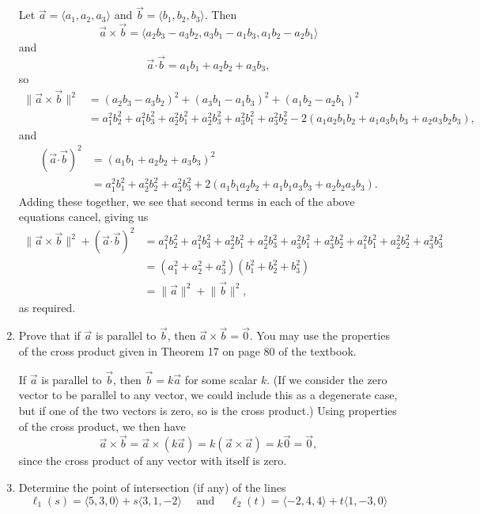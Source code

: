 \documentclass[12pt]{article}
\newcommand{\len}[1]{\lVert #1\rVert}
\newcommand{\dotp}{\boldsymbol{\cdot}}
\begin{document}
\begin{enumerate}
Let $\vec{a} = \langle a_1,a_2,a_3\rangle$ and $\vec{b}=\langle b_1,b_2,b_3\rangle$. Then
\[
\vec{a}\times\vec{b} = \langle a_2b_3-a_3b_2,a_3b_1-a_1b_3,a_1b_2-a_2b_1\rangle
\]
and
\[
\vec{a}\dotp\vec{b} = a_1b_1+a_2b_2+a_3b_3,
\]
so
\begin{align*}
\len{\vec{a}\times\vec{b}}^2 &= (a_2b_3-a_3b_2)^2+(a_3b_1-a_1b_3)^2+(a_1b_2-a_2b_1)^2\\
&=a_1^2b_2^2+a_1^2b_3^2+a_2^2b_1^2+a_2^2b_3^2+a_3^2b_1^2+a_3^2b_2^2-2(a_1a_2b_1b_2+a_1a_3b_1b_3+a_2a_3b_2b_3),
\end{align*}
and
\begin{align*}
(\vec{a}\dotp\vec{b})^2 & = (a_1b_1+a_2b_2+a_3b_3)^2\\
& = a_1^2b_1^2+a_2^2b_2^2+a_3^2b_3^2 +2(a_1b_1a_2b_2+a_1b_1a_3b_3+a_2b_2a_3b_3).
\end{align*}
Adding these together, we see that second terms in each of the above equations cancel, giving us
\begin{align*}
\len{\vec{a}\times\vec{b}}^2+(\vec{a}\dotp\vec{b})^2 &= a_1^2b_2^2+a_1^2b_3^2+a_2^2b_1^2+a_2^2b_3^2+a_3^2b_1^2 +a_3^2b_2^2+a_1^2b_1^2+a_2^2b_2^2+a_3^2b_3^2\\
&=(a_1^2+a_2^2+a_3^2)(b_1^2+b_2^2+b_3^2)\\
& = \len{\vec{a}}^2+\len{\vec{b}}^2,
\end{align*}
as required.

\item Prove that if $\vec{a}$ is parallel to $\vec{b}$, then $\vec{a}\times\vec{b}=\vec{0}$. You may use the properties of the cross product given in Theorem 17 on page 80 of the textbook.

\bigskip

If $\vec{a}$ is parallel to $\vec{b}$, then $\vec{b}=k\vec{a}$ for some scalar $k$. (If we consider the zero vector to be parallel to any vector, we could include this as a degenerate case, but if one of the two vectors is zero, so is the cross product.) Using properties of the cross product, we then have
\[
\vec{a}\times \vec{b} = \vec{a}\times (k\vec{a}) = k(\vec{a}\times\vec{a})=k\vec{0}=\vec{0},
\]
since the cross product of any vector with itself is zero.

\medskip

\item Determine the point of intersection (if any) of the lines
\[
\ell_1(s)  = \langle 5,3,0\rangle + s\langle 3,1,-2\rangle\quad\text{ and } \quad
\ell_2(t)  = \langle -2,4,4\rangle+t\langle 1,-3,0\rangle
\]


\end{enumerate}
\end{document}
